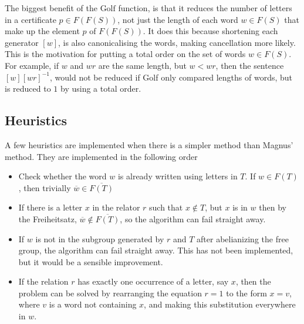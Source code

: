 \documentclass[12pt]{article} %
\theoremstyle{definition}
\theoremstyle{definition}
\theoremstyle{definition}
\theoremstyle{definition}
\begin{document}
The biggest benefit of the $\text{Golf}$ function, is that it reduces the number
of letters in a certificate $p \in F(F(S))$, not just the length of each word
$w \in F(S)$ that make up the element $p$ of $F(F(S))$.
It does this because shortening each generator $[w]$, is also
canonicalising the words, making cancellation more likely. This is the motivation
for putting a total order on the set of words $w \in F(S)$.
For example, if $w$ and $wr$ are the same length, but $w < wr$, then
the sentence $[w][wr]^{-1}$, would not be reduced if Golf only compared lengths of words,
but is reduced to $1$ by using a total order.




\subsection{Heuristics}

A few heuristics are implemented when there is a simpler method than Magnus' method.
They are implemented in the following order

\begin{itemize}
  \item Check whether the word $w$ is already written using letters in $T$. If $w \in F(T)$,
  then trivially $\overline{w} \in \overline{F(T)}$

  \item If there is a letter $x$ in the relator $r$ such that $x \notin T$, but
  $x$ is in $w$ then by the Freiheitsatz, $\overline{w} \notin \overline{F(T)}$,
  so the algorithm can fail straight away.

  \item If $w$ is not in the subgroup generated by $r$ and $T$ after abelianizing the free
    group, the algorithm can fail straight away. This has not been implemented, but it would
    be a sensible improvement.

  \item If the relation $r$ has exactly one occurrence of a letter, say $x$, then
    the problem can be solved by rearranging the equation $r = 1$ to the form
    $x = v$, where $v$ is a word not containing $x$, and making this substitution everywhere
    in $w$.
\end{itemize}
\end{document}
